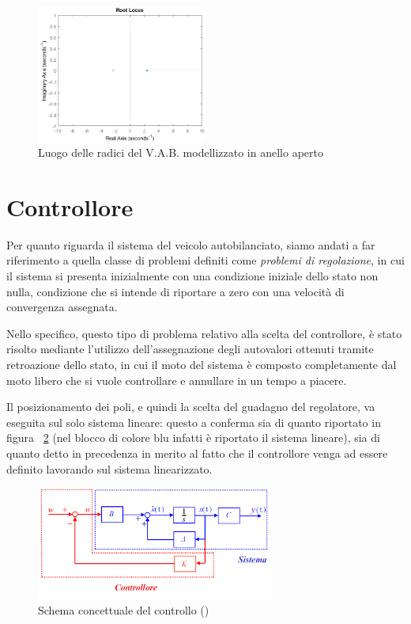 \begin{figure}[H]
	\centering   	
	\includegraphics[width=0.5\textwidth]{Immagini/root_locus_open_loop.png}
	\caption{Luogo delle radici del V.A.B. modellizzato in anello aperto}
	\label{fig:r_locus_openloop}
\end{figure}

\section{Controllore}
Per quanto riguarda il sistema del veicolo autobilanciato, siamo andati a far riferimento a quella classe di problemi definiti come \textit{problemi di regolazione}, in cui il sistema si presenta inizialmente con una condizione iniziale dello stato non nulla, condizione che si intende di riportare a zero con una velocità di convergenza assegnata.

Nello specifico, questo tipo di problema relativo alla scelta del controllore, è stato risolto mediante l'utilizzo dell'assegnazione degli autovalori ottenuti tramite retroazione dello stato, in cui il moto del sistema è composto completamente dal moto libero che si vuole controllare e annullare in un tempo a piacere.

Il posizionamento dei poli, e quindi la scelta del guadagno del regolatore, va eseguita sul solo sistema lineare: questo a conferma sia di quanto riportato in figura ~\ref{fig:feedback_state} (nel blocco di colore blu infatti è riportato il sistema lineare), sia di quanto detto in precedenza in merito al fatto che il controllore venga ad essere definito lavorando sul sistema linearizzato.

\begin{figure}[H]
	\centering   	
	\includegraphics[width=0.70\textwidth]{Immagini/feedback_state.png}
	\caption{Schema concettuale del controllo (\cite{feedback_state})}
	\label{fig:feedback_state}
\end{figure}


